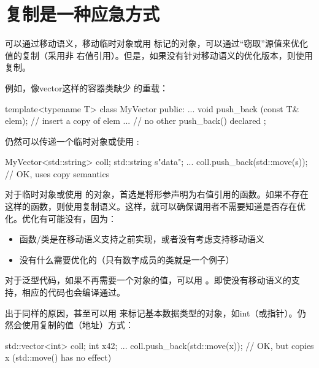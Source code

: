 \section{复制是一种应急方式}
可以通过移动语义，移动临时对象或用  标记的对象，可以通过“窃取”源值来优化值的复制（采用非  右值引用）。但是，如果没有针对移动语义的优化版本，则使用复制。

例如，像vector这样的容器类缺少  的重载：

\begin{cppcode}
template<typename T>
class MyVector {
	public:
	...
	void push_back (const T& elem); // insert a copy of elem
	... // no other push_back() declared
};
\end{cppcode}

仍然可以传递一个临时对象或使用 :

\begin{cppcode}
MyVector<std::string> coll;
std::string s{"data"};
...
coll.push_back(std::move(s)); // OK, uses copy semantics
\end{cppcode}

对于临时对象或使用  的对象，首选是将形参声明为右值引用的函数。如果不存在这样的函数，则使用复制语义。这样，就可以确保调用者不需要知道是否存在优化。优化有可能没有，因为：


\begin{itemize}
	\item 函数/类是在移动语义支持之前实现，或者没有考虑支持移动语义
	\item 没有什么需要优化的（只有数字成员的类就是一个例子）
\end{itemize}

对于泛型代码，如果不再需要一个对象的值，可以用 。即使没有移动语义的支持，相应的代码也会编译通过。


出于同样的原因，甚至可以用  来标记基本数据类型的对象，如int（或指针）。仍然会使用复制的值（地址）方式：


\begin{cppcode}
std::vector<int> coll;
int x{42};
...
coll.push_back(std::move(x)); // OK, but copies x (std::move() has no effect)
\end{cppcode}


	